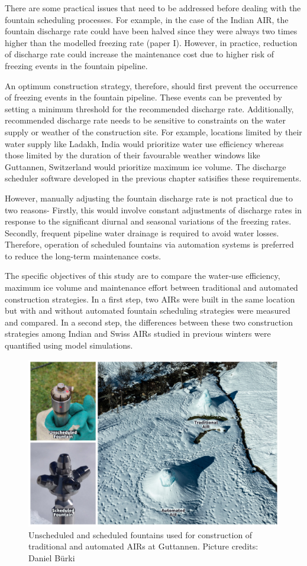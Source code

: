 There are some practical issues that need to be addressed before dealing with the fountain scheduling processes.
For example, in the case of the Indian AIR, the fountain discharge rate could have been halved since they were
always two times higher than the modelled freezing rate (paper I). However, in practice, reduction of discharge
rate could increase the maintenance cost due to higher risk of freezing events in the fountain pipeline.

An optimum construction strategy, therefore, should first prevent the occurrence of freezing events in the
fountain pipeline. These events can be prevented by setting a minimum threshold for the recommended discharge
rate. Additionally, recommended discharge rate needs to be sensitive to constraints on the water supply or
weather of the construction site. For example, locations limited by their water supply like Ladakh, India
would prioritize water use efficiency whereas those limited by the duration of their favourable weather windows
like Guttannen, Switzerland would prioritize maximum ice volume. The discharge scheduler software developed in
the previous chapter satisifies these requirements.

However, manually adjusting the fountain discharge rate is not practical due to two reasons- Firstly, this would
involve constant adjustments of discharge rates in response to the significant diurnal and seasonal variations
of the freezing rates. Secondly, frequent pipeline water drainage is required to avoid water losses. Therefore,
operation of scheduled fountains via automation systems is preferred to reduce the long-term maintenance costs.

The specific objectives of this study are to compare the water-use efficiency, maximum ice volume and
maintenance effort between traditional and automated construction strategies. In a first step, two AIRs were
built in the same location but with and without automated fountain scheduling strategies were measured and
compared. In a second step, the differences between these two construction strategies among Indian and Swiss
AIRs studied in previous winters were quantified using model simulations. 

\begin{figure}[htb]
\includegraphics[width=12cm]{figs/AIR_fountains.jpg}
\caption{Unscheduled and scheduled fountains used for construction of traditional and automated AIRs at Guttannen. Picture credits: Daniel Bürki}
\label{fig:2AIR}
\end{figure}

